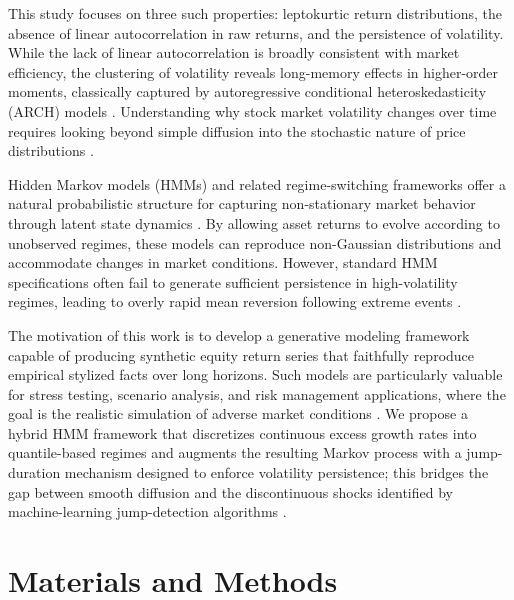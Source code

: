 \documentclass[11pt, letterpaper]{article}
\begin{document}
This study focuses on three such properties: leptokurtic return distributions, the absence of linear autocorrelation in raw returns, and the persistence of volatility. While the lack of linear autocorrelation is broadly consistent with market efficiency, the clustering of volatility reveals long-memory effects in higher-order moments, classically captured by autoregressive conditional heteroskedasticity (ARCH) models \cite{engle_1982}. Understanding why stock market volatility changes over time requires looking beyond simple diffusion into the stochastic nature of price distributions \cite{schwert_why_1989, stein_stock_1991}.

Hidden Markov models (HMMs) and related regime-switching frameworks offer a natural probabilistic structure for capturing non-stationary market behavior through latent state dynamics \cite{rabiner_introduction_1986}. By allowing asset returns to evolve according to unobserved regimes, these models can reproduce non-Gaussian distributions and accommodate changes in market conditions. However, standard HMM specifications often fail to generate sufficient persistence in high-volatility regimes, leading to overly rapid mean reversion following extreme events \cite{ryden_stylized_1998, bulla_stylized_2006}.

The motivation of this work is to develop a generative modeling framework capable of producing synthetic equity return series that faithfully reproduce empirical stylized facts over long horizons. Such models are particularly valuable for stress testing, scenario analysis, and risk management applications, where the goal is the realistic simulation of adverse market conditions \cite{assefa_generating_2021, kwon_can_2024}. We propose a hybrid HMM framework that discretizes continuous excess growth rates into quantile-based regimes and augments the resulting Markov process with a jump-duration mechanism designed to enforce volatility persistence; this bridges the gap between smooth diffusion and the discontinuous shocks identified by machine-learning jump-detection algorithms \cite{au_yeung_jump_2020}.

\section{Materials and Methods}
\label{sec:methods}
\end{document}
